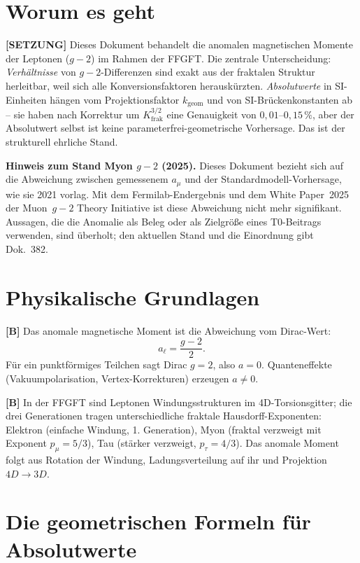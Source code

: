 \section{Worum es geht}


\textbf{[SETZUNG]} Dieses Dokument behandelt die anomalen magnetischen Momente
der Leptonen ($g-2$) im Rahmen der FFGFT. Die zentrale Unterscheidung:
\emph{Verhältnisse} von $g-2$-Differenzen sind exakt aus der fraktalen Struktur
herleitbar, weil sich alle Konversionsfaktoren herauskürzten.
\emph{Absolutwerte} in SI-Einheiten hängen vom Projektionsfaktor $k_\text{geom}$
und von SI-Brückenkonstanten ab -- sie haben nach Korrektur um $K_\text{frak}^{3/2}$
eine Genauigkeit von $0{,}01$--$0{,}15\,\%$, aber der Absolutwert selbst ist
keine parameterfrei-geometrische Vorhersage. Das ist der strukturell ehrliche Stand.

	\medskip\noindent\textbf{Hinweis zum Stand Myon $g-2$ (2025).} Dieses Dokument bezieht sich auf die Abweichung zwischen gemessenem $a_\mu$ und der Standardmodell-Vorhersage, wie sie 2021 vorlag. Mit dem Fermilab-Endergebnis und dem White Paper~2025 der Muon~$g-2$ Theory Initiative ist diese Abweichung nicht mehr signifikant. Aussagen, die die Anomalie als Beleg oder als Zielgröße eines T0-Beitrags verwenden, sind überholt; den aktuellen Stand und die Einordnung gibt Dok.~382.


\section{Physikalische Grundlagen}

\textbf{[B]} Das anomale magnetische Moment ist die Abweichung vom Dirac-Wert:
\[
  a_\ell = \frac{g-2}{2}.
\]
Für ein punktförmiges Teilchen sagt Dirac $g=2$, also $a=0$. Quanteneffekte
(Vakuumpolarisation, Vertex-Korrekturen) erzeugen $a\neq0$.

\textbf{[B]} In der FFGFT sind Leptonen Windungsstrukturen im 4D-Torsionsgitter;
die drei Generationen tragen unterschiedliche fraktale Hausdorff-Exponenten:
Elektron (einfache Windung, 1. Generation), Myon (fraktal verzweigt mit
Exponent $p_\mu=5/3$), Tau (stärker verzweigt, $p_\tau=4/3$). Das anomale
Moment folgt aus Rotation der Windung, Ladungsverteilung auf ihr und Projektion
$4D\to3D$.

\section{Die geometrischen Formeln für Absolutwerte}

